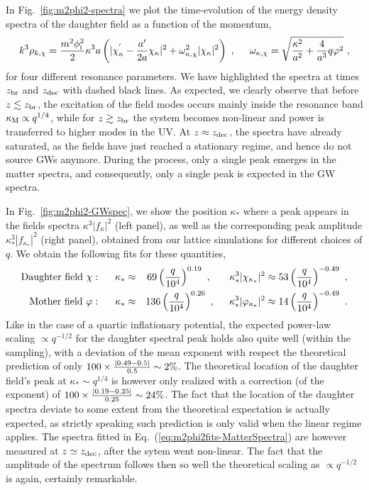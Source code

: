 \documentclass[a4paper,11pt]{article}
\newcommand{\be}{\begin{equation}}
\newcommand{\ee}{\end{equation}}
\newcommand{\bea}{\begin{eqnarray}}
\newcommand{\eea}{\end{eqnarray}}
\begin{document}
In Fig.~\ref{fig:m2phi2-spectra} we plot the time-evolution of the energy density spectra of the daughter field as a function of the momentum, 
\be k^3 \rho_{k, \chi} = \frac{m^2 \phi_{\rm i}^2}{2} \kappa^3 a \left(  | \chi^{'}_{\kappa} - \frac{a'}{2 a } \chi_{\kappa} |^2  + \omega_{\kappa,\chi}^{2} | \chi_{\kappa} |^2 \right) \ , \hspace{0.5cm} \omega_{\kappa,\chi} = \sqrt{\frac{\kappa^2}{a^2} + \frac{4}{a^3} q \varphi^2 
} \label{eq:m2phi2-energy-density} \ , \ee
for four different resonance parameters. We have highlighted the spectra at times $z_{\rm br}$ and $z_{\rm dec}$ with dashed black lines. As expected, we clearly observe that before $z \lesssim z_{\rm br}$, the excitation of the field modes occurs mainly inside the resonance band $\kappa_{\rm M} \propto q^{1/4}$, while for $z \gtrsim z_{\rm br}$ the system becomes non-linear and power is transferred to higher modes in the UV. At $z \approx z_{\rm dec}$, the spectra have already saturated, as the fields have just reached a stationary regime, and hence do not source GWs anymore. During the process, only a single peak emerges in the matter spectra, and consequently, only a single peak is expected in the GW spectra. 

In Fig.~\ref{fig:m2phi2-GWspec}, we show the position $\kappa_*$ where a peak appears in the fields spectra $\kappa^3 |f_{\kappa}|^2$ (left panel), as well as the corresponding peak amplitude $\kappa_*^3 |f_{\kappa_*}|^2$ (right panel), obtained from our lattice simulations for different choices of $q$. We obtain the following fits for these quantities,
 \bea  {\rm Daughter~field}~\chi : \hspace{0.5cm} \kappa_* & \approx & 69 \left(q \over 10^4 \right)^{0.19}   \ , \hspace{0.64cm} \kappa_*^{3}{ |\chi_{\kappa_*} |^2} \approx  53 \left(q \over 10^4 \right)^{-0.49} \ , \nonumber \\ 
 {\rm Mother~field}~\varphi: \hspace{0.5cm}\kappa_* &\approx & 136 \left(q \over 10^4 \right)^{0.26} \ , \hspace{0.5cm} \kappa_*^{3} {| \varphi_{\kappa_*} |^2} \approx  14 \left(q \over 10^4 \right)^{-0.49}
  \ . \label{eq:m2phi2fits-MatterSpectra}
 \eea
Like in the case of a quartic inflationary potential, the expected power-law scaling $\propto q^{-1/2}$ for the daughter spectral peak holds also quite well (within the sampling), with a deviation of the mean exponent with respect the theoretical prediction of only $100\times{|0.49-0.5|\over0.5} \sim 2\%$. The theoretical location of the daughter field's peak at $\kappa_* \sim q^{1/4}$ is however only realized with a correction (of the exponent) of $100\times{|0.19-0.25|\over0.25} \sim 24\%$. The fact that the location of the daughter spectra deviate to some extent from the theoretical expectation is actually expected, as strictly speaking such prediction is only valid when the linear regime applies. The spectra fitted in Eq.~(\ref{eq:m2phi2fits-MatterSpectra}) are however measured at $z \simeq z_{\rm dec}$, after the sytem went non-linear. The fact that the amplitude of the spectrum follows then so well the theoretical scaling as $\propto q^{-1/2}$ is again, certainly remarkable. 
\end{document}
